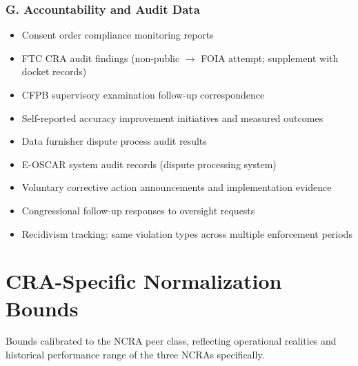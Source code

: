 \documentclass[a4paper,11pt]{article}
\begin{document}
	\subsubsection{G. Accountability and Audit Data}
	
	\begin{itemize}[leftmargin=1.5em]
		\item Consent order compliance monitoring reports
		\item FTC CRA audit findings (non-public $\to$ FOIA attempt; supplement with docket records)
		\item CFPB supervisory examination follow-up correspondence
		\item Self-reported accuracy improvement initiatives and measured outcomes
		\item Data furnisher dispute process audit results
		\item E-OSCAR system audit records (dispute processing system)
		\item Voluntary corrective action announcements and implementation evidence
		\item Congressional follow-up responses to oversight requests
		\item Recidivism tracking: same violation types across multiple enforcement periods
	\end{itemize}
	
	\newpage
	\section{CRA-Specific Normalization Bounds}
	\label{sec:cra-bounds}
	
	Bounds calibrated to the NCRA peer class, reflecting operational realities and historical performance range of the three NCRAs specifically.
	
\end{document}

